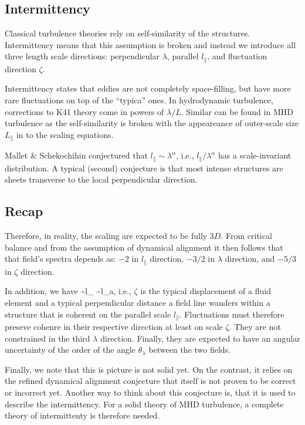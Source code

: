 \documentclass[usenatbib,twocolumn]{aastex63}
\begin{document}
\subsection{Intermittency}

Classical turbulence theories rely on self-similarity of the structures. 
Intermittency means that this assumption is broken and instead we introduce all three length scale directions: 
perpendicular $\lambda$, parallel $l_\parallel$, and fluctuation direction $\zeta$.

Intermittency states that eddies are not completely space-filling, but have more rare fluctuations on top of the ``typica'' ones.
In hydrodynamic turbulence, corrections to K41 theory come in powers of $\lambda/L$.
Similar can be found in MHD turbulence as the self-similarity is broken with the appeareance of outer-scale size $L_\parallel$ in to the scaling equations.

Mallet \& Schekochihin conjectured that $l_\parallel \sim \lambda^\alpha$, i.e., $l_\parallel/\lambda^\alpha$ has a scale-invariant distribution.
A typical (second) conjecture is that most intense structures are sheets transverse to the local perpendicular direction.


\subsection{Recap}

Therefore, in reality, the scaling are expected to be fully $3D$.
From critical balance and from the assumption of dynamical alignment it then follows that that field's spectra depends as:
$-2$ in $l_\parallel$ direction,
$-3/2$ in $\lambda$ direction, and
$-5/3$ in $\zeta$ direction.

In addition, we have
\be
\zeta \sim l_\parallel {} \sim l_\parallel {}a,
\ee
i.e., $\zeta$ is the typical displacement of a fluid element and a typical perpendicular distance a field line wanders within a structure that is coherent on the parallel scale $l_\parallel$.
Fluctuations must therefore preseve cohenre in their respective direction at least on scale $\zeta$.
They are not constrained in the third $\lambda$ direction.
Finally, they are expected to have an angular uncertainty of the order of the angle $\theta_\lambda$ between the two fields.

Finally, we note that this is picture is not solid yet.
On the contrast, it relies on the refined dynamical alignment conjecture that itself is not proven to be correct or incorrect yet.
Another way to think about this conjecture is, that it is used to describe the intermittency.
For a solid theory of MHD turbulence, a complete theory of intermittenty is therefore needed.
\end{document}
